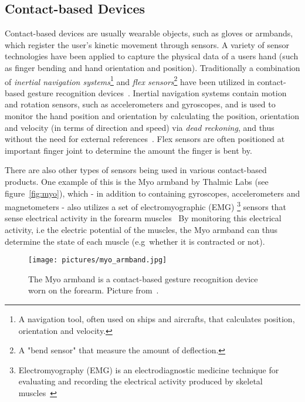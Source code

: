 \subsection{Contact-based Devices} 
Contact-based devices are usually wearable objects, such as gloves or armbands, 
which register the user's kinetic movement through sensors. %
A variety of sensor technologies have been applied to capture the physical data of a users hand (such as finger bending and hand orientation and position).
Traditionally a combination of \textit{inertial navigation systems}\footnote{A navigation tool, often used on ships and aircrafts, that calculates position, orientation and velocity.} 
and \textit{flex sensors}\footnote{A "bend sensor" that measure the amount of deflection.} have been utilized in contact-based gesture recognition devices~\citep{Sturman1994}. 
Inertial navigation systems contain motion and rotation sensors, such as accelerometers and gyroscopes, and is used to monitor the hand position and orientation by
calculating the position, orientation and velocity (in terms of direction and speed) via \textit{dead reckoning}, and thus without the need for external references~\citep{Berg1970}.
Flex sensors are often positioned at important finger joint to determine the amount the finger is bent by. 

There are also other types of sensors being used in various contact-based products. 
One example of this is the Myo armband by Thalmic Labs (see figure~\vref{fig:myo}), which - in addition to containing gyroscopes, accelerometers and magnetometers - also utilizes 
a set of electromyographic (EMG)
\footnote{Electromyography (EMG) is an electrodiagnostic medicine technique for evaluating and recording the electrical activity produced by skeletal muscles~\citep{Kamen2004}}
sensors that sense electrical activity in the forearm muscles~\citep{Myo2015} 
By monitoring this electrical activity, i.e the electric potential of the muscles, the Myo armband can thus determine the state of each muscle (e.g~whether it is contracted or not).


\begin{figure}%
	\texttt{[image: pictures/myo\_armband.jpg]}
	\caption[The Myo armband]{The Myo armband is a contact-based gesture recognition device worn on the forearm. Picture from~\citet{Myo2015}.}
	\label{fig:myo}
\end{figure}

